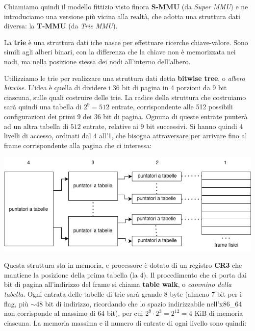 \documentclass[a4paper,11pt]{article}
\begin{document}
Chiamiamo quindi il modello fittizio visto finora \textbf{S-MMU} (da \textit{Super MMU}) e ne introduciamo una versione più vicina alla realtà, che adotta una struttura dati diversa: la \textbf{T-MMU} (da \textit{Trie MMU}).

La \textbf{trie} è una struttura dati iche nasce per effettuare ricerche chiave-valore.
Sono simili agli alberi binari, con la differenza che la chiave non è memorizzata nei nodi, ma nella posizione stessa dei nodi all'interno dell'albero.

Utilizziamo le trie per realizzare una struttura dati detta \textbf{bitwise tree}, o \textit{albero bitwise}.
L'idea è quella di dividere i 36 bit di pagina in 4 porzioni da 9 bit ciascuna, sulle quali costruire delle trie.
La radice della struttura che costruiamo sarà quindi una tabella di $2^9 = 512$ entrate, corrispondente alle 512 possibili configurazioni dei primi 9 dei 36 bit di pagina.
Ognuna di queste entrate punterà ad un altra tabella di $512$ entrate, relative ai 9 bit successivi.
Si hanno quindi 4 livelli di accesso, ordinati dal 4 all'1, che bisogna attraversare per arrivare fino al frame corrispondente alla pagina che ci interessa:

\begin{center}
	\includegraphics[scale=0.6]{../figures/mmu_trie.png}
\end{center}

Questa struttura sta in memoria, e processore è dotato di un registro \textbf{CR3} che mantiene la posizione della prima tabella (la 4). 
Il procedimento che ci porta dai bit di pagina all'indirizzo del frame si chiama \textbf{table walk}, o \textit{cammino della tabella}.
Ogni entrata delle tabelle di trie sarà grande 8 byte (almeno 7 bit per i flag, più $\sim 48$ bit di indirizzo, ricordando che lo spazio indirizzabile nell'x86\_64 non corrisponde al massimo di 64 bit), per cui $2^9 \cdot 2^3 = 2^{12} = 4\text{ KiB}$ di memoria ciascuna.
La memoria massima e il numero di entrate di ogni livello sono quindi:
\end{document}
